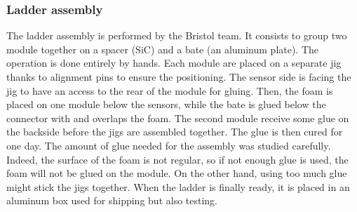 
    \subsubsection{Ladder assembly}

    The ladder assembly is performed by the Bristol team.
    It consists to group two module together on a spacer (\gls{SiC}) and a bate (an aluminum plate).
    The operation is done entirely by hands.
    Each module are placed on a separate jig thanks to alignment pins to ensure the positioning.
    The sensor side is facing the jig to have an access to the rear of the module for gluing.
    Then, the foam is placed on one module below the sensors, while the bate is glued below the connector with and overlaps the foam.
    The second module receive some glue on the backside before the jigs are assembled together.
    The glue is then cured for one day.
    The amount of glue needed for the assembly was studied carefully. 
    Indeed, the surface of the foam is not regular, so if not enough glue is used, the foam will not be glued on the module.
    On the other hand, using too much glue might stick the jigs together.
    When the ladder is finally ready, it is placed in an aluminum box used for shipping but also testing.
   
